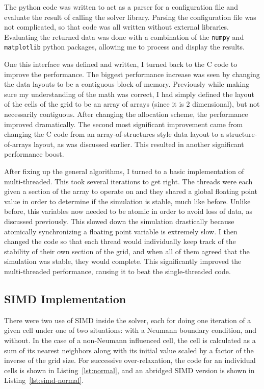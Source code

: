 The python code was written to act as a parser for a configuration file and evaluate the result of calling the solver library.
Parsing the configuration file was not complicated, so that code was all written without external libraries. Evaluating the
returned data was done with a combination of the \texttt{numpy} and \texttt{matplotlib} python packages, allowing me to process
and display the results.

One this interface was defined and written, I turned back to the C code to improve the performance. The biggest performance increase
was seen by changing the data layouts to be a contiguous block of memory. Previously while making sure my understanding of the math was
correct, I had simply defined the layout of the cells of the grid to be an array of arrays (since it is 2 dimensional), but not necessarily
contiguous. After changing the allocation scheme, the performance improved dramatically. The second most significant improvement came from
changing the C code from an array-of-structures style data layout to a structure-of-arrays layout, as was discussed earlier. This resulted in
another significant performance boost.

After fixing up the general algorithms, I turned to a basic implementation of multi-threaded. This took several iterations to get right. The threads
were each given a section of the array to operate on and they shared a global floating point value in order to determine if the simulation is stable, much like before.
Unlike before, this variables now needed to be atomic in order to avoid loss of data, as discussed previously. This slowed down the simulation
drastically because atomically synchronizing a floating point variable is extremely slow. I then changed the code so that each thread would individually keep
track of the stability of their own section of the grid, and when all of them agreed that the simulation was stable, they would complete. This significantly improved
the multi-threaded performance, causing it to beat the single-threaded code.

\subsection{SIMD Implementation}
There were two use of SIMD inside the solver, each for doing one iteration of a given cell under one of two situations: with a Neumann boundary condition, and
without. In the case of a non-Neumann influenced cell, the cell is calculated as a sum of its nearest neighbors along with its initial value scaled by a
factor of the inverse of the grid size. For successive over-relaxation, the code for an individual cells is shown in Listing~\ref{lst:normal}, and an abridged
SIMD version is shown in Listing~\ref{lst:simd-normal}.

